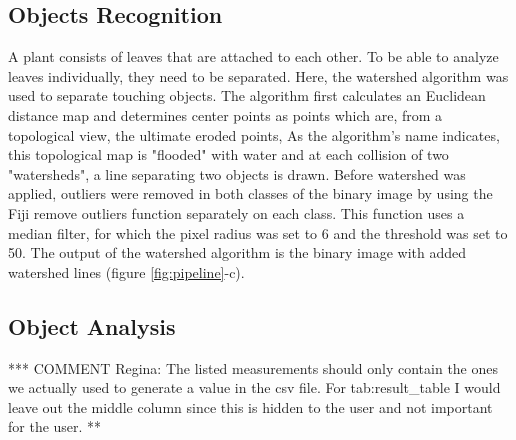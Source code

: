 \documentclass[paper=A4,bibliography=totocnumbered]{scrartcl}
\begin{document}
\subsection{Objects Recognition}
A plant consists of leaves that are attached to each other. To be able to analyze leaves individually, they need to be separated. Here, the watershed algorithm was used to separate touching objects. The algorithm first calculates an Euclidean distance map and determines center points as points which are, from a topological view, the ultimate eroded points, As the algorithm's name indicates, this topological map is "flooded" with water and at each collision of two "watersheds", a line separating two objects is drawn. Before watershed was applied, outliers were removed in both classes of the binary image by using the Fiji remove outliers function separately on each class. This function uses a median filter, for which the pixel radius was set to 6 and the threshold was set to 50. The output of the watershed algorithm is the binary image with added watershed lines (figure \ref{fig:pipeline}-c). 

\subsection{Object Analysis}
*** COMMENT Regina: The listed measurements should only contain the ones we actually used to generate a value in the csv file. For tab:result\_table I would leave out the middle column since this is hidden to the user and not important for the user. **
\end{document}
